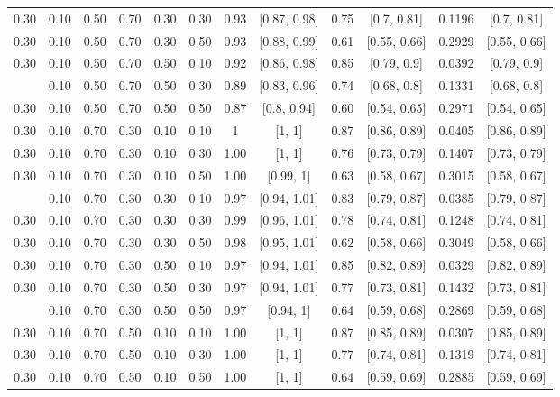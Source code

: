 \documentclass[
  11pt,
]{article}
\begin{document}
\begin{landscape}
\begin{ThreePartTable}
\begin{longtable}[t]{cccccccccccc}
0.30 & 0.10 & 0.50 & 0.70 & 0.30 & 0.30 & 0.93 & {}[0.87, 0.98] & 0.75 & {}[0.7, 0.81] & 0.1196 & {}[0.7, 0.81]\\
0.30 & 0.10 & 0.50 & 0.70 & 0.30 & 0.50 & 0.93 & {}[0.88, 0.99] & 0.61 & {}[0.55, 0.66] & 0.2929 & {}[0.55, 0.66]\\
0.30 & 0.10 & 0.50 & 0.70 & 0.50 & 0.10 & 0.92 & {}[0.86, 0.98] & 0.85 & {}[0.79, 0.9] & 0.0392 & {}[0.79, 0.9]\\
\addlinespace
0.30 & 0.10 & 0.50 & 0.70 & 0.50 & 0.30 & 0.89 & {}[0.83, 0.96] & 0.74 & {}[0.68, 0.8] & 0.1331 & {}[0.68, 0.8]\\
0.30 & 0.10 & 0.50 & 0.70 & 0.50 & 0.50 & 0.87 & {}[0.8, 0.94] & 0.60 & {}[0.54, 0.65] & 0.2971 & {}[0.54, 0.65]\\
0.30 & 0.10 & 0.70 & 0.30 & 0.10 & 0.10 & 1 & {}[1, 1] & 0.87 & {}[0.86, 0.89] & 0.0405 & {}[0.86, 0.89]\\
0.30 & 0.10 & 0.70 & 0.30 & 0.10 & 0.30 & 1.00 & {}[1, 1] & 0.76 & {}[0.73, 0.79] & 0.1407 & {}[0.73, 0.79]\\
0.30 & 0.10 & 0.70 & 0.30 & 0.10 & 0.50 & 1.00 & {}[0.99, 1] & 0.63 & {}[0.58, 0.67] & 0.3015 & {}[0.58, 0.67]\\
\addlinespace
0.30 & 0.10 & 0.70 & 0.30 & 0.30 & 0.10 & 0.97 & {}[0.94, 1.01] & 0.83 & {}[0.79, 0.87] & 0.0385 & {}[0.79, 0.87]\\
0.30 & 0.10 & 0.70 & 0.30 & 0.30 & 0.30 & 0.99 & {}[0.96, 1.01] & 0.78 & {}[0.74, 0.81] & 0.1248 & {}[0.74, 0.81]\\
0.30 & 0.10 & 0.70 & 0.30 & 0.30 & 0.50 & 0.98 & {}[0.95, 1.01] & 0.62 & {}[0.58, 0.66] & 0.3049 & {}[0.58, 0.66]\\
0.30 & 0.10 & 0.70 & 0.30 & 0.50 & 0.10 & 0.97 & {}[0.94, 1.01] & 0.85 & {}[0.82, 0.89] & 0.0329 & {}[0.82, 0.89]\\
0.30 & 0.10 & 0.70 & 0.30 & 0.50 & 0.30 & 0.97 & {}[0.94, 1.01] & 0.77 & {}[0.73, 0.81] & 0.1432 & {}[0.73, 0.81]\\
\addlinespace
0.30 & 0.10 & 0.70 & 0.30 & 0.50 & 0.50 & 0.97 & {}[0.94, 1] & 0.64 & {}[0.59, 0.68] & 0.2869 & {}[0.59, 0.68]\\
0.30 & 0.10 & 0.70 & 0.50 & 0.10 & 0.10 & 1.00 & {}[1, 1] & 0.87 & {}[0.85, 0.89] & 0.0307 & {}[0.85, 0.89]\\
0.30 & 0.10 & 0.70 & 0.50 & 0.10 & 0.30 & 1.00 & {}[1, 1] & 0.77 & {}[0.74, 0.81] & 0.1319 & {}[0.74, 0.81]\\
0.30 & 0.10 & 0.70 & 0.50 & 0.10 & 0.50 & 1.00 & {}[1, 1] & 0.64 & {}[0.59, 0.69] & 0.2885 & {}[0.59, 0.69]\\

\end{longtable}
\end{ThreePartTable}
\end{landscape}
\end{document}
